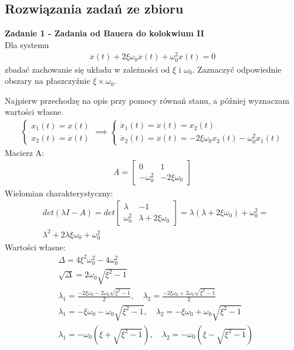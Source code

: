 \documentclass[a4paper,11pt]{article}
\begin{document}
\subsection{Rozwiązania zadań ze zbioru}
\begin{framed}
\textbf{Zadanie 1 - Zadania od Bauera do kolokwium II } \\ 
Dla systemu
\begin{align*}
\ddot{x}(t)+2\xi \omega_{0}\dot{x}(t)+\omega_{0}^{2}x(t) = 0
\end{align*}
zbadać zachowanie się układu w zależności od \( \xi \) i \( \omega_{0} \). Zaznaczyć odpowiednie obszary na płaszczyźnie \( \xi \times \omega_{0} \). 
\end{framed}
Najpierw przechodzę na opis przy pomocy równań stanu, a później wyznaczam wartości własne. 
\begin{align*}
\begin{cases}
x_{1}(t) = x(t) \\
x_{2}(t) = \dot{x}(t)
\end{cases}
\implies
\begin{cases}
\dot{x}_{1}(t)=\dot{x}(t)=x_{2}(t) \\
\dot{x}_{2}(t)=\ddot{x}(t)=-2\xi \omega_{0}x_{2}(t)-\omega_{0}^{2}x_{1}(t) 
\end{cases}
\end{align*}
Macierz A:
\begin{align*}
A = 
\begin{bmatrix}
0 & 1 \\
-\omega_{0}^{2} & -2\xi \omega_{0}
\end{bmatrix}
\end{align*}
Wielomian charakterystyczny:
\begin{align*}
&det( \lambda I - A ) =
det 
\begin{bmatrix}
\lambda & -1 \\
\omega _{0}^{2} & \lambda +2\xi \omega _{0}
\end{bmatrix}=
\lambda ( \lambda +2\xi \omega _{0} ) + \omega _{0}^{2}= \\
&\lambda ^{2} +2\lambda \xi \omega _{0} + \omega_{0}^{2}
\end{align*}
Wartości własne:
\begin{align*}
&\Delta = 4\xi ^{2} \omega _{0}^{2} - 4\omega _{0}^{2} \\
&\sqrt{\Delta } = 2\omega_{0} \sqrt{\xi ^{2} - 1} \\
&\lambda_{1} = \frac{-2\xi \omega_{0} - 2\omega_{0} \sqrt{\xi ^{2} - 1} }{2 } , \quad \lambda_{2} = \frac{-2\xi \omega_{0} + 2\omega_{0} \sqrt{\xi ^{2} - 1} }{2 } \\
&\lambda_{1} = -\xi \omega_{0} - \omega_{0} \sqrt{\xi ^{2} - 1}  , \quad \lambda_{2} = -\xi \omega_{0} + \omega_{0} \sqrt{\xi ^{2} - 1} \\
&\lambda_{1} = -\omega_{0} ( \xi  + \sqrt{\xi ^{2} - 1} ) , \quad \lambda_{2} = -\omega_{0} ( \xi  - \sqrt{\xi ^{2} - 1} ) 
\end{align*}
\end{document}
